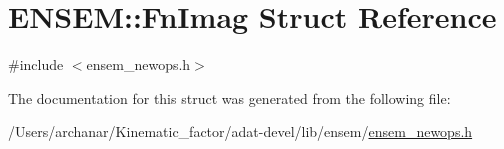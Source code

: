 \hypertarget{structENSEM_1_1FnImag}{}\section{E\+N\+S\+EM\+:\+:Fn\+Imag Struct Reference}
\label{structENSEM_1_1FnImag}


{\ttfamily \#include $<$ensem\+\_\+newops.\+h$>$}



The documentation for this struct was generated from the following file\+:\begin{DoxyCompactItemize}
\item 
/\+Users/archanar/\+Kinematic\+\_\+factor/adat-\/devel/lib/ensem/\mbox{\hyperlink{adat-devel_2lib_2ensem_2ensem__newops_8h}{ensem\+\_\+newops.\+h}}\end{DoxyCompactItemize}
